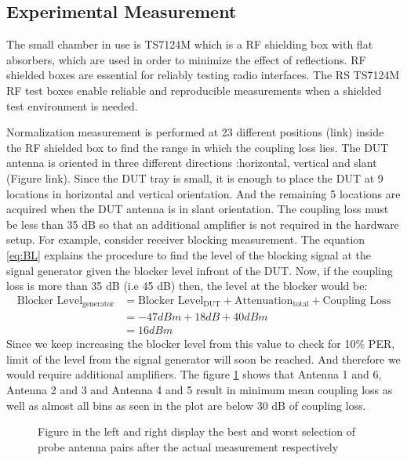 \subsection{Experimental Measurement} 
The small chamber in use is TS7124M which is a \acs{RF} shielding box with flat absorbers, which are used in order to minimize the effect of reflections. \acs{RF} shielded boxes are essential for reliably testing radio interfaces. The \acs{RS}\textregistered{} TS7124M \acs{RF} test boxes enable reliable and reproducible measurements when a shielded test environment is needed.

Normalization measurement is performed at 23 different positions (link) inside the RF shielded box to find the range in which the coupling loss lies. The \acs{DUT} antenna is oriented in three different directions :horizontal, vertical and slant (Figure link). Since the DUT tray is small, it is enough to place the \acs{DUT} at 9 locations in horizontal and vertical orientation. And the remaining 5 locations are acquired when the \acs{DUT} antenna is in slant orientation. The coupling loss must be less than 35 dB so that an additional amplifier is not required in the hardware setup. For example, consider receiver blocking measurement. The equation \ref{eq:BL} explains the procedure to find the level of the blocking signal at the signal generator given the blocker level  infront of the \acs{DUT}. Now, if the coupling loss is more than 35 dB (i.e 45 dB) then, the level at the blocker would be:
\begin{equation}
\begin{split}
\mbox{Blocker Level}_{\mbox{generator}}  &= \mbox{Blocker Level}_{\mbox{DUT}} + \mbox{Attenuation}_{\mbox{total}} + \mbox{Coupling Loss} \label{eq:egBL} \\
& = -47 dBm + 18 dB + 40 dBm \\
& = 16 dBm
\end{split}
\end{equation}
Since we keep increasing the blocker level from this value to check for 10\% \acs{PER}, limit of the level from the signal generator will soon be reached. And therefore we would require additional amplifiers. The figure \ref{fig:man} shows that Antenna 1 and 6, Antenna 2 and 3 and Antenna 4 and 5 result in minimum mean coupling loss as well as almost all bins as seen in the plot are below 30 dB of coupling loss.

\begin{figure}[H]
\centering
  \centering
\caption{Figure in the left and right display the best and worst selection of probe antenna pairs after the actual measurement respectively}
\label{fig:man}
\end{figure}

